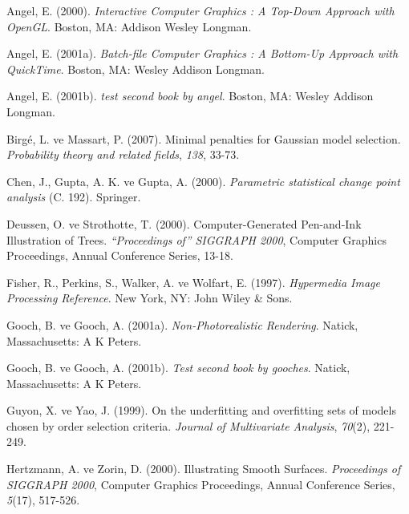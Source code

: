 \documentclass[12pt,twoside]{deuthesis}
\begin{document}

\hypertarget{refs}{}
\begin{CSLReferences}{1}{0}
\leavevmode{}%
Angel, E. (2000). \emph{Interactive Computer Graphics : A Top-Down Approach with OpenGL}. Boston, MA: Addison Wesley Longman.

\leavevmode{}%
Angel, E. (2001a). \emph{Batch-file Computer Graphics : A Bottom-Up Approach with QuickTime}. Boston, MA: Wesley Addison Longman.

\leavevmode{}%
Angel, E. (2001b). \emph{test second book by angel}. Boston, MA: Wesley Addison Longman.

\leavevmode{}%
Birgé, L. ve Massart, P. (2007). Minimal penalties for Gaussian model selection. \emph{Probability theory and related fields}, \emph{138}, 33-73.

\leavevmode{}%
Chen, J., Gupta, A. K. ve Gupta, A. (2000). \emph{Parametric statistical change point analysis} (C. 192). Springer.

\leavevmode{}%
Deussen, O. ve Strothotte, T. (2000). Computer-Generated Pen-and-Ink Illustration of Trees. \emph{{``Proceedings of''} SIGGRAPH 2000}, Computer Graphics Proceedings, Annual Conference Series, 13-18.

\leavevmode{}%
Fisher, R., Perkins, S., Walker, A. ve Wolfart, E. (1997). \emph{Hypermedia Image Processing Reference}. New York, NY: John Wiley \& Sons.

\leavevmode{}%
Gooch, B. ve Gooch, A. (2001a). \emph{{Non-Photorealistic Rendering}}. Natick, Massachusetts: A K Peters.

\leavevmode{}%
Gooch, B. ve Gooch, A. (2001b). \emph{Test second book by gooches}. Natick, Massachusetts: A K Peters.

\leavevmode{}%
Guyon, X. ve Yao, J. (1999). On the underfitting and overfitting sets of models chosen by order selection criteria. \emph{Journal of Multivariate Analysis}, \emph{70}(2), 221-249.

\leavevmode{}%
Hertzmann, A. ve Zorin, D. (2000). Illustrating Smooth Surfaces. \emph{Proceedings of SIGGRAPH 2000}, Computer Graphics Proceedings, Annual Conference Series, \emph{5}(17), 517-526.


\end{CSLReferences}
\end{document}
